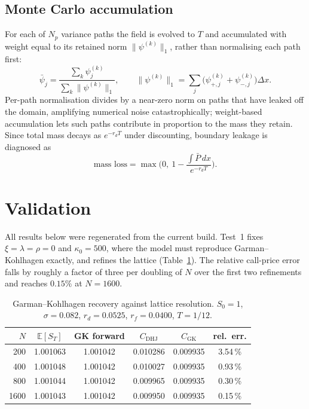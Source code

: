 \documentclass[11pt]{article}
\begin{document}
\subsection{Monte Carlo accumulation}

For each of $N_p$ variance paths the field is evolved to $T$ and accumulated
with weight equal to its retained norm $\|\psi^{(k)}\|_1$, rather than
normalising each path first:
\begin{equation}
\bar{\psi}_j = \frac{\sum_{k} \psi^{(k)}_j}{\sum_{k}\|\psi^{(k)}\|_1},
\qquad \|\psi^{(k)}\|_1 = \textstyle\sum_j \big(\psi^{(k)}_{+,j} + \psi^{(k)}_{-,j}\big)\Delta x .
\end{equation}
Per-path normalisation divides by a near-zero norm on paths that have leaked
off the domain, amplifying numerical noise catastrophically;
weight-based accumulation lets such paths contribute in proportion to the
mass they retain. Since total mass decays as $e^{-r_d T}$ under discounting,
boundary leakage is diagnosed as
\begin{equation}
\text{mass loss} = \max\!\Big(0,\ 1 - \frac{\int \bar{P}\,dx}{e^{-r_d T}}\Big).
\end{equation}

\section{Validation}
\label{sec:val}

All results below were regenerated from the current build. Test~1 fixes
$\xi = \lambda = \rho = 0$ and $\kappa_0 = 500$, where the model must
reproduce Garman--Kohlhagen exactly, and refines the lattice
(Table~\ref{tab:conv}). The relative call-price error falls by roughly a
factor of three per doubling of $N$ over the first two refinements and
reaches $0.15\%$ at $N = 1600$.

\begin{table}[ht]
\centering\small
\begin{tabular}{rccccc}
\toprule
$N$ & $\mathbb{E}[S_T]$ & GK forward & $C_{\text{DHJ}}$ & $C_{\text{GK}}$ & rel.\ err.\\
\midrule
200  & 1.001063 & 1.001042 & 0.010286 & 0.009935 & 3.54\,\% \\
400  & 1.001048 & 1.001042 & 0.010027 & 0.009935 & 0.93\,\% \\
800  & 1.001044 & 1.001042 & 0.009965 & 0.009935 & 0.30\,\% \\
1600 & 1.001043 & 1.001042 & 0.009950 & 0.009935 & 0.15\,\% \\
\bottomrule
\end{tabular}
\caption{Garman--Kohlhagen recovery against lattice resolution.
$S_0=1$, $\sigma=0.082$, $r_d=0.0525$, $r_f=0.0400$, $T=1/12$.}
\label{tab:conv}
\end{table}
\end{document}
